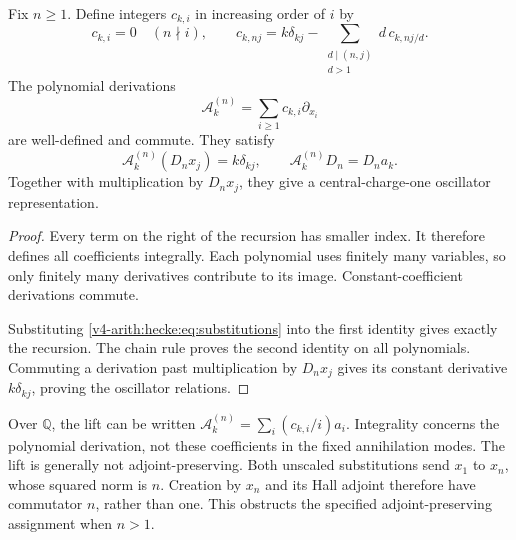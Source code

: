 \begin{proposition}
\label{v4-arith:hecke:prop:annihilation}
Fix $n\geq1$. Define integers $c_{k,i}$ in increasing order of $i$ by
\[
 c_{k,i}=0\quad(n\nmid i),\qquad
 c_{k,nj}=k\delta_{kj}
 -\sum_{\substack{d\mid(n,j)\\d>1}}d\,c_{k,nj/d}.
\]
The polynomial derivations
\[
 \mathcal A_k^{(n)}=\sum_{i\geq1}c_{k,i}\partial_{x_i}
\]
are well-defined and commute. They satisfy
\[
 \mathcal A_k^{(n)}(D_nx_j)=k\delta_{kj},\qquad
 \mathcal A_k^{(n)}D_n=D_na_k.
\]
Together with multiplication by $D_nx_j$, they give
a central-charge-one oscillator representation.
\end{proposition}
\begin{proof}
Every term on the right of the recursion has smaller index.
It therefore defines all coefficients integrally.
Each polynomial uses finitely many variables, so only finitely
many derivatives contribute to its image.
Constant-coefficient derivations commute.

Substituting \eqref{v4-arith:hecke:eq:substitutions} into the first identity
gives exactly the recursion.
The chain rule proves the second identity on all polynomials.
Commuting a derivation past multiplication by $D_nx_j$ gives
its constant derivative $k\delta_{kj}$, proving the oscillator relations.
\end{proof}

Over $\mathbb Q$, the lift can be written
$\mathcal A_k^{(n)}=\sum_i(c_{k,i}/i)a_i$.
Integrality concerns the polynomial derivation, not these coefficients
in the fixed annihilation modes.
The lift is generally not adjoint-preserving.
Both unscaled substitutions send $x_1$ to $x_n$, whose squared norm is $n$.
Creation by $x_n$ and its Hall adjoint therefore have commutator $n$,
rather than one. This obstructs the specified adjoint-preserving
assignment when $n>1$.

